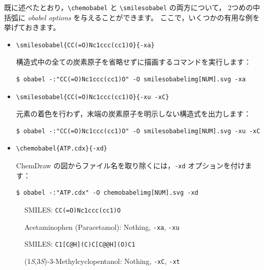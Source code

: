 \documentclass[12pt]{ltjsarticle}
\begin{document}
既に述べたとおり，\verb|\chemobabel| と \verb|\smilesobabel| の両方について，
2つめの中括弧に \textit{obabel options} を与えることができます。
ここで，いくつかの有用な例を挙げておきます。
\begin{itemize}
\item
\begin{verbatim}
\smilesobabel{CC(=O)Nc1ccc(cc1)O}{-xa}
\end{verbatim}
構造式中の全ての炭素原子を省略せずに描画するコマンドを実行します：
\begin{verbatim}
$ obabel -:"CC(=O)Nc1ccc(cc1)O" -O smilesobabelimg[NUM].svg -xa
\end{verbatim}
\item
\begin{verbatim}
\smilesobabel{CC(=O)Nc1ccc(cc1)O}{-xu -xC}
\end{verbatim}
元素の着色を行わず，末端の炭素原子を明示しない構造式を出力します：
\begin{verbatim}
$ obabel -:"CC(=O)Nc1ccc(cc1)O" -O smilesobabelimg[NUM].svg -xu -xC
\end{verbatim}
\item
\begin{verbatim}
\chemobabel{ATP.cdx}{-xd}
\end{verbatim}
ChemDraw の図からファイル名を取り除くには，\texttt{-xd} オプションを付けます：
\begin{verbatim}
$ obabel -:"ATP.cdx" -O chemobabelimg[NUM].svg -xd
\end{verbatim}
\end{itemize}

\begin{figure}[ht]
  \centering
   \hspace{1cm}
   \hspace{1cm}
  \caption{Acetaminophen (Paracetamol): Nothing, \texttt{-xa}, \texttt{-xu}}
  SMILES: \verb|CC(=O)Nc1ccc(cc1)O|
\end{figure}

\begin{figure}[ht]
  \centering
   \hspace{1cm}
   \hspace{1cm}
  \caption{(1\textit{S},3\textit{S})-3-Methylcyclopentanol: Nothing, \texttt{-xC}, \texttt{-xt}}
  SMILES: \verb|C1[C@H](C)C[C@@H](O)C1|
\end{figure}
\end{document}
